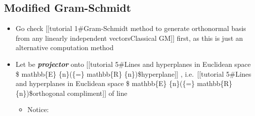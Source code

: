 \subsection*{Modified Gram-Schmidt}

\begin{itemize}

\item
  Go check {[}{[}tutorial 1\#Gram-Schmidt method to generate orthonormal
  basis from any linearly independent vectors\textbar Classical GM{]}{]}
  first, as this is just an alternative computation method
\item
  Let
  be \textbf{\emph{projector}} onto {[}{[}tutorial 5\#Lines and
  hyperplanes in Euclidean space \$ mathbb\{E\} \{n\}(\{=\} mathbb\{R\}
  \{n\})\$\textbar hyperplane{]}{]}
  , i.e.~{[}{[}tutorial
  5\#Lines and hyperplanes in Euclidean space \$ mathbb\{E\} \{n\}(\{=\}
  mathbb\{R\} \{n\})\$\textbar orthogonal compliment{]}{]} of line

  \begin{itemize}
  
  \item
    Notice:

    \begin{itemize}
    

\end{itemize}
\end{itemize}
\end{itemize}

